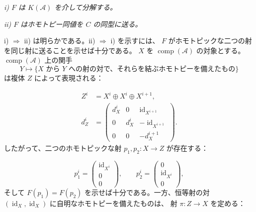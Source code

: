 \clearpage
{}%
\begingroup\small\setlength{\parskip}{0pt}\setlength{\emergencystretch}{1.5em}
\setlength{\abovedisplayskip}{4pt plus 2pt minus 2pt}%
\setlength{\belowdisplayskip}{4pt plus 2pt minus 2pt}%

\noindent\textit{i) $F$ は $K(\mathcal A)$ を介して分解する。}

\noindent\textit{ii) $F$ はホモトピー同値を $C$ の同型に送る。}

i) $\Rightarrow$ ii) は明らかである。ii) $\Rightarrow$ i) を示すには、
$F$ がホモトピックな二つの射を同じ射に送ることを示せば十分である。
$X$ を $\operatorname{comp}(\mathcal A)$ の対象とする。
$\operatorname{comp}(\mathcal A)$ 上の関手
\[
Y\longmapsto
\{\text{$X$ から $Y$ への射の対で、それらを結ぶホモトピーを備えたもの}\}
\]
は複体 $Z$ によって表現される：

\begin{equation}
\begin{aligned}
Z^i&=X^i\oplus X^i\oplus X^{i+1},\\[2pt]
d_Z^i&=
\begin{pmatrix}
d_X^i&0&\operatorname{id}_{X^{i+1}}\\
0&d_X^i&-\operatorname{id}_{X^{i+1}}\\
0&0&-d_X^{i+1}
\end{pmatrix}.
\end{aligned}
\tag{1.3.6.1}
\end{equation}
したがって、二つのホモトピックな射
$p_1,p_2\colon X\longrightarrow Z$ が存在する：

\begin{equation}
p_1^i=
\begin{pmatrix}
\operatorname{id}_{X^i}\\0\\0
\end{pmatrix},
\qquad
p_2^i=
\begin{pmatrix}
0\\\operatorname{id}_{X^i}\\0
\end{pmatrix},
\tag{1.3.6.2}
\end{equation}
そして $F(p_1)=F(p_2)$ を示せば十分である。一方、恒等射の対
$(\operatorname{id}_X,\operatorname{id}_X)$ に自明なホモトピーを備えたものは、
射 $\pi\colon Z\longrightarrow X$ を定める：

